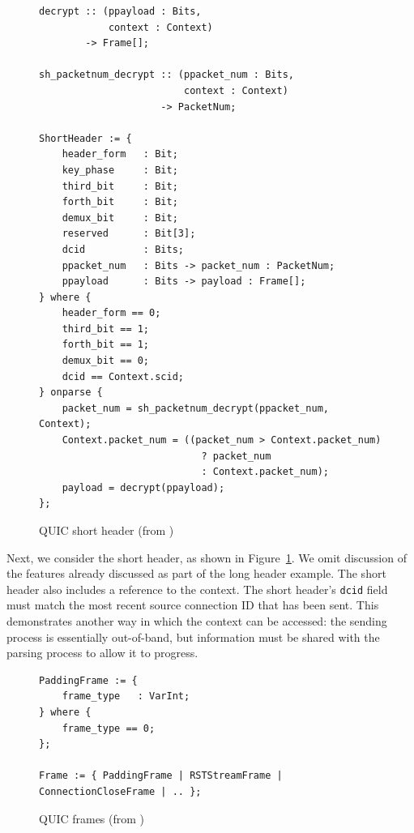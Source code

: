 \documentclass[10pt,sigconf]{acmart}
\begin{document}
\begin{figure}
	\vspace{3mm}
    \begin{BVerbatim}[fontsize=\scriptsize]
decrypt :: (ppayload : Bits, 
            context : Context) 
        -> Frame[];

sh_packetnum_decrypt :: (ppacket_num : Bits, 
                         context : Context) 
                     -> PacketNum;
                     
ShortHeader := {
	header_form   : Bit;
	key_phase     : Bit;
	third_bit     : Bit;
	forth_bit     : Bit;
	demux_bit     : Bit;
	reserved      : Bit[3];
	dcid          : Bits;
	ppacket_num   : Bits -> packet_num : PacketNum;
	ppayload      : Bits -> payload : Frame[];
} where {
	header_form == 0;
	third_bit == 1;
	forth_bit == 1;
	demux_bit == 0;
	dcid == Context.scid;
} onparse {
	packet_num = sh_packetnum_decrypt(ppacket_num, Context);
	Context.packet_num = ((packet_num > Context.packet_num)
	                        ? packet_num 
	                        : Context.packet_num);
	payload = decrypt(ppayload);
};
    \end{BVerbatim}
    \caption{QUIC short header (from \cite{draft-ietf-quic-transport-latest})}
    \label{fig:quic-short-hdr-desc}
\end{figure}

Next, we consider the short header, as shown in Figure~\ref{fig:quic-short-hdr-desc}. We
omit discussion of the features already discussed as part of the long header example.
The short header
also includes a reference to the context. The short header's \texttt{dcid} field must
match the most recent source connection ID that has been sent. This demonstrates another
way in which the context can be accessed: the sending process is essentially out-of-band,
but information must be shared with the parsing process to allow it to progress.

\begin{figure}
	\vspace{3mm}
    \begin{BVerbatim}[fontsize=\scriptsize]
PaddingFrame := {
	frame_type   : VarInt;
} where {
	frame_type == 0;
};

Frame := { PaddingFrame | RSTStreamFrame | ConnectionCloseFrame | .. };
    \end{BVerbatim}
    \caption{QUIC frames (from \cite{draft-ietf-quic-transport-latest})}
    \label{fig:quic-frame-desc}
\end{figure}
\end{document}
